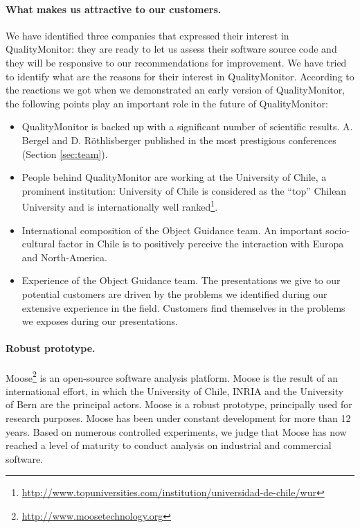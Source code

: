\documentclass[runningheads]{llncs}
\newcommand{\secref}[1]{Section \ref{sec:#1}}
\begin{document}

\paragraph{What makes us attractive to our customers. }
We have identified three companies that expressed their interest in QualityMonitor: they are ready to let us assess their software source code and they will be responsive to our recommendations for improvement. 
We have tried to identify what are the reasons for their interest in QualityMonitor. According to the reactions we got when we demonstrated an early version of QualityMonitor, the following points play an important role in the future of QualityMonitor:
\begin{itemize}
\item QualityMonitor is backed up with a significant number of scientific results. A. Bergel and D. R\"othlisberger published in the most prestigious conferences (\secref{team}).
\item People behind QualityMonitor are working at the University of Chile, a prominent institution: University of Chile is considered as the ``top'' Chilean University and is internationally well ranked\footnote{\url{http://www.topuniversities.com/institution/universidad-de-chile/wur}}.
\item International composition of the Object Guidance team. An important socio-cultural factor in Chile is to positively perceive the interaction with Europa and North-America.
\item Experience of the Object Guidance team. The presentations we give to our potential customers are driven by the problems we identified during our extensive experience in the field. Customers find themselves in the problems we exposes during our presentations.
\end{itemize}


\paragraph{Robust prototype.}
Moose\footnote{\url{http://www.moosetechnology.org}} is an open-source software analysis platform. Moose is the result of an international effort, in which the University of Chile, INRIA and the University of Bern are the principal actors. Moose is a robust prototype, principally used for research purposes. Moose has been under constant development for more than 12 years. Based on numerous controlled experiments, we judge that Moose has now reached a level of maturity to conduct analysis on industrial and commercial software. 
\end{document}
